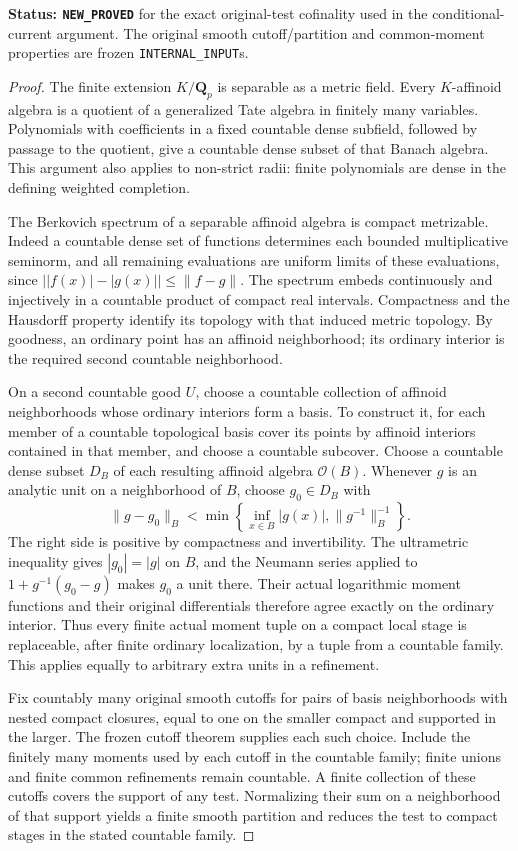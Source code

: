 \documentclass[11pt,a4paper]{article}
\numberwithin{equation}{section}
\theoremstyle{definition}
\theoremstyle{remark}
\begin{document}
\noindent\textbf{Status: \texttt{NEW\_PROVED}} for the exact
original-test cofinality used in the conditional-current argument.
The original smooth cutoff/partition and common-moment properties
are frozen \texttt{INTERNAL\_INPUT}s.

\begin{proof}
The finite extension $K/\mathbf Q_p$ is separable as a metric field.
Every $K$-affinoid algebra is a quotient of a generalized Tate
algebra in finitely many variables. Polynomials with coefficients
in a fixed countable dense subfield, followed by passage to the
quotient, give a countable dense subset of that Banach algebra.
This argument also applies to non-strict radii: finite polynomials
are dense in the defining weighted completion.

The Berkovich spectrum of a separable affinoid algebra is compact
metrizable. Indeed a countable dense set of functions determines
each bounded multiplicative seminorm, and all remaining evaluations
are uniform limits of these evaluations, since
$\bigl||f(x)|-|g(x)|\bigr|\le\|f-g\|$. The spectrum embeds
continuously and injectively in a countable product of compact
real intervals. Compactness and the Hausdorff property identify
its topology with that induced metric topology. By goodness, an
ordinary point has an affinoid neighborhood; its ordinary interior
is the required second countable neighborhood.

On a second countable good $U$, choose a countable collection of
affinoid neighborhoods whose ordinary interiors form a basis.
To construct it, for each member of a countable topological basis
cover its points by affinoid interiors contained in that member,
and choose a countable subcover. Choose a countable dense subset
$D_B$ of each resulting affinoid algebra $\mathcal O(B)$.
Whenever $g$ is an analytic unit on a neighborhood of $B$, choose
$g_0\in D_B$ with
\[
 \|g-g_0\|_B<\min\left\{\inf_{x\in B}|g(x)|,\|g^{-1}\|_B^{-1}\right\}.
 \tag{DI1}
\]
The right side is positive by compactness and invertibility. The
ultrametric inequality gives $|g_0|=|g|$ on $B$, and the Neumann
series applied to $1+g^{-1}(g_0-g)$ makes $g_0$ a unit there. Their actual
logarithmic moment functions and their original differentials
therefore agree exactly on the ordinary interior. Thus every finite
actual moment tuple on a compact local stage is replaceable, after
finite ordinary localization, by a tuple from a countable family.
This applies equally to arbitrary extra units in a refinement.

Fix countably many original smooth cutoffs for pairs of basis
neighborhoods with nested compact closures, equal to one on the
smaller compact and supported in the larger. The frozen cutoff
theorem supplies each such choice. Include the finitely many
moments used by each cutoff in the countable family; finite unions
and finite common refinements remain countable. A finite collection
of these cutoffs covers the support of any test. Normalizing their
sum on a neighborhood of that support yields a finite smooth
partition and reduces the test to compact stages in the stated
countable family.


\end{proof}
\end{document}
